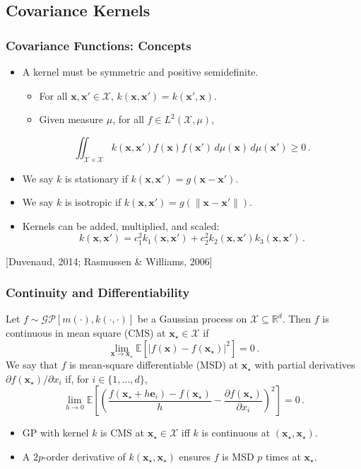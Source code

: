 \documentclass{beamer}
\newcommand{\R}{\mathbb{R}}
\newcommand{\vect}[1]{\boldsymbol{#1}}
\newcommand{\E}[1]{\mathbb{E}\left[#1\right]}
\providecommand{\norm}[1]{\lVert#1\rVert}
\newcommand{\citeAY}[1]{
	\begin{flushright}
		{\footnotesize [#1]}
	\end{flushright}
}
\begin{document}
	\subsection{Covariance Kernels}
	\begin{frame}
		\frametitle{Covariance Functions: Concepts}
		\begin{itemize}
			\item A kernel must be symmetric and positive semidefinite.
			\begin{itemize}
				\item For all $\vect{x},\vect{x}'\in\mathcal{X}$, $k(\vect{x},\vect{x}')=k(\vect{x}',\vect{x})$.
				\item Given measure $\mu$, for all $f\in L^2(\mathcal{X},\mu)$, 
			\end{itemize}
			$$\iint_{\mathcal{X}\times\mathcal{X}}k(\vect{x},\vect{x}')f(\vect{x})f(\vect{x}')\,d\mu(\vect{x})\,d\mu(\vect{x}')\geq0\,.$$
			\item We say $k$ is stationary if $k(\vect{x},\vect{x}')=g(\vect{x}-\vect{x}')$.
			\item We say $k$ is isotropic if $k(\vect{x},\vect{x}')=g(\norm{\vect{x}-\vect{x}'})$.
			\item Kernels can be added, multiplied, and scaled:
			\begin{equation*}
				k(\vect{x},\vect{x}') = c_1^2k_1(\vect{x},\vect{x}')+c_2^2k_2(\vect{x},\vect{x}')k_3(\vect{x},\vect{x}')\,.
			\end{equation*}
		\end{itemize}
		\citeAY{Duvenaud, 2014; Rasmussen \& Williams, 2006}
	\end{frame}

	\begin{frame}
		\frametitle{Continuity and Differentiability}
		\begin{definition}
			Let $f\sim \mathcal{GP}\left[m(\cdot),k(\cdot,\cdot)\right]$ be a Gaussian process on $\mathcal{X}\subseteq\R^d$. Then $f$ is continuous in mean square (CMS) at $\vect{x}_\star\in\mathcal{X}$ if $$\lim_{\vect{x}\to\vect{x}_\star}\E{|f(\vect{x})-f(\vect{x}_\star)|^2}=0\,.$$ We say that $f$ is mean-square differentiable (MSD) at $\vect{x}_\star$ with partial derivatives $\partial f(\vect{x}_\star)/\partial x_i$ if, for $i\in\{1,\ldots,d\}$, $$\lim_{h\to0}\E{\left(\frac{f(\vect{x}_\star+h\vect{e}_i)-f(\vect{x}_\star)}{h}-\frac{\partial f(\vect{x}_\star)}{\partial x_i}\right)^2}=0\,.$$
		\end{definition}
		\begin{itemize}
			\item GP with kernel $k$ is CMS at $\vect{x}_\star\in\mathcal{X}$ iff $k$ is continuous at $(\vect{x}_\star,\vect{x}_\star)$.
			\item A $2p$-order derivative of $k(\vect{x}_\star,\vect{x}_\star)$ ensures $f$ is MSD $p$ times at $\vect{x}_\star$.
		\end{itemize}
	\end{frame}
\end{document}
